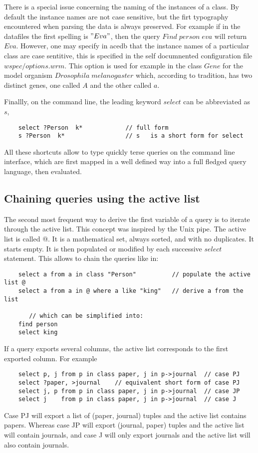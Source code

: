 \documentclass[11pt]{article}
\newcommand{\BL}{\begin{lstlisting}}
\begin{document}
There is a special issue concerning the naming of the instances of a class. By default
the instance names are not case sensitive, but the firt typography encountered when parsing
the data is always preserved. For example if in the datafiles the first spelling is $"Eva"$, then
the query $Find\; person\; eva$ will return $Eva$. However, one may specify in acedb that the
instance names of a particular class are case sentitive, this is specified in the
self documnented configuration file $wspec/options.wrm$. This option is used for example
in the class $Gene$ for the model organism $Drosophila\;melanogaster$ which, according
to tradition, has two distinct genes, one called $A$ and the other called $a$.


Finallly, on the command line, the leading keyword $select$ can be abbreviated as $s$,
\BL
    select ?Person  k*            // full form
    s ?Person  k*                 // s   is a short form for select
\end{lstlisting}

All these shortcuts allow to type quickly terse queries on the command line interface, 
which are first mapped in a well defined way into a full fledged query language,
then evaluated.


\subsection{Chaining queries using the active list}
The second most frequent way to derive the first variable of a query is to iterate 
through the active list. This concept was inspired by the Unix pipe. 
The active list is called @. It is a mathematical set, always sorted,
and with no duplicates. It starts empty. It is then populated 
or modified by each successive $select$ statement. This allows to chain the queries like in:
\BL
    select a from a in class "Person"          // populate the active list @
    select a from a in @ where a like "king"   // derive a from the list

       // which can be simplified into:
    find person
    select king
\end{lstlisting}

If a query exports several columns, the active list corresponds to the first exported column. For example
\BL
    select p, j from p in class paper, j in p->journal  // case PJ
    select ?paper, >journal    // equivalent short form of case PJ
    select j, p from p in class paper, j in p->journal  // case JP
    select j    from p in class paper, j in p->journal  // case J
\end{lstlisting}
Case PJ will export a list of (paper, journal) tuples and the active list contains 
papers. Whereas case JP will export (journal, paper) tuples and the active list 
will contain journals, and case J will only export journals  and the active list will also contain journals.
\end{document}
